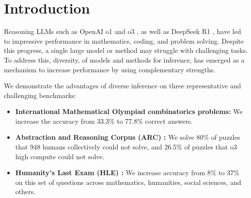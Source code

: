 \section{Introduction}
Reasoning LLMs such as OpenAI o1 \cite{strawberry} and o3 \cite{o3mini}, as well as DeepSeek R1 \cite{guo2025deepseek}, have led to impressive performance in mathematics, coding, and problem solving. Despite this progress, a single large model or method may struggle with challenging tasks. To address this, diversity, of models and methods for inference, has emerged as a mechanism to increase performance by using complementary strengths.

We demonstrate the advantages of diverse inference on three representative and challenging benchmarks: 
\begin{itemize} 
\item \textbf{International Mathematical Olympiad \cite{imo} combinatorics problems:} We increase the accuracy from 33.3\% to 77.8\% correct answers.
\item \textbf{Abstraction and Reasoning Corpus (ARC) \cite{chollet2019measure}:} We solve 80\% of puzzles that 948 humans collectively could not solve, and 26.5\% of puzzles that o3 high compute could not solve. 
\item \textbf{Humanity’s Last Exam (HLE) \cite{phan2025hle}:} We increase accuracy from 8\% to 37\% on this set of questions across mathematics, humanities, social sciences, and others.
\end{itemize}

